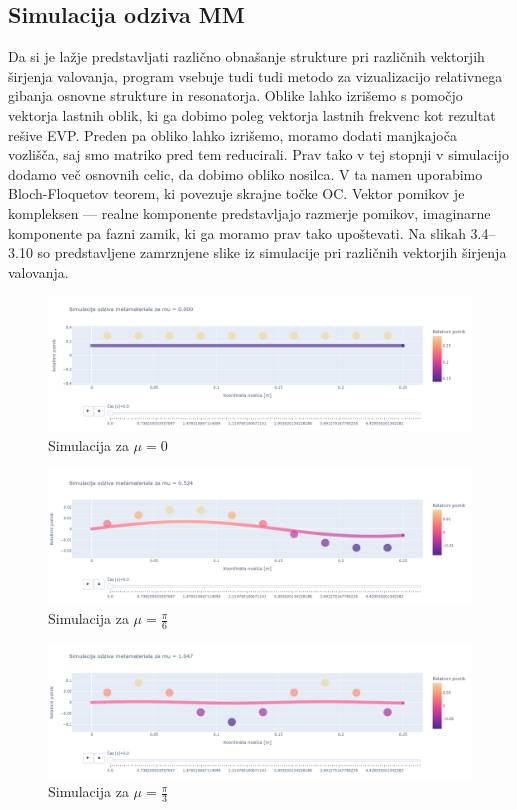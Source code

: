 \documentclass[12pt]{report}
\begin{document}
\subsection{Simulacija odziva \ac{MM}}
Da si je lažje predstavljati različno obnašanje strukture pri različnih vektorjih širjenja valovanja, program vsebuje tudi tudi metodo za vizualizacijo relativnega gibanja osnovne strukture
in resonatorja. Oblike lahko izrišemo s pomočjo vektorja lastnih oblik, ki ga dobimo poleg vektorja lastnih frekvenc kot rezultat rešive \ac{EVP}. Preden pa obliko lahko izrišemo, moramo dodati manjkajoča
vozlišča, saj smo matriko pred tem reducirali. Prav tako v tej stopnji v simulacijo dodamo več osnovnih celic, da dobimo obliko nosilca. V ta namen uporabimo Bloch-Floquetov teorem, ki povezuje skrajne točke \ac{OC}.
Vektor pomikov je kompleksen --- realne komponente predstavljajo razmerje pomikov, imaginarne komponente pa fazni zamik, ki ga moramo prav tako upoštevati. Na slikah 3.4--3.10 so predstavljene zamrznjene slike iz simulacije pri 
različnih vektorjih širjenja valovanja. 
\begin{figure}[H]
  \centering
  \includegraphics[trim={0 4cm 0 3.5cm},clip, scale=0.3]{Images/mu0.png}
  \caption{Simulacija za $\mu = 0$}
\end{figure}
\begin{figure}[H]
  \centering
  \includegraphics[trim={0 4cm 0 3.5cm},clip, scale=0.3]{Images/mupi_6.png}
  \caption{Simulacija za $\mu = \frac{\pi}{6}$}
\end{figure}
\begin{figure}[H]
  \centering
  \includegraphics[trim={0 4cm 0 3.5cm},clip, scale=0.3]{Images/mupi_3.png}
  \caption{Simulacija za $\mu = \frac{\pi}{3}$}
\end{figure}
\end{document}
